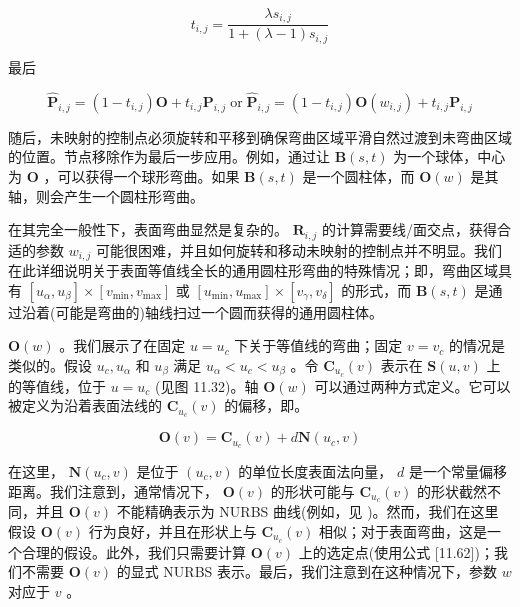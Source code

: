 \documentclass[../main.tex]{subfiles}
\begin{document}
\[
{t}_{i,j} = \frac{\lambda {s}_{i,j}}{1 + \left( {\lambda  - 1}\right) {s}_{i,j}} \tag{11.60}
\]





最后

\[
{\widehat{\mathbf{P}}}_{i,j} = \left( {1 - {t}_{i,j}}\right) \mathbf{O} + {t}_{i,j}{\mathbf{P}}_{i,j}\;\mathrm{{or}}\;{\widehat{\mathbf{P}}}_{i,j} = \left( {1 - {t}_{i,j}}\right) \mathbf{O}\left( {w}_{i,j}\right)  + {t}_{i,j}{\mathbf{P}}_{i,j} \tag{11.61}
\]

随后，未映射的控制点必须旋转和平移到确保弯曲区域平滑自然过渡到未弯曲区域的位置。节点移除作为最后一步应用。例如，通过让 \(\mathbf{B}\left( {s,t}\right)\) 为一个球体，中心为 \(\mathbf{O}\) ，可以获得一个球形弯曲。如果 \(\mathbf{B}\left( {s,t}\right)\) 是一个圆柱体，而 \(\mathbf{O}\left( w\right)\) 是其轴，则会产生一个圆柱形弯曲。

在其完全一般性下，表面弯曲显然是复杂的。 \({\mathbf{R}}_{i,j}\) 的计算需要线/面交点，获得合适的参数 \({w}_{i,j}\) 可能很困难，并且如何旋转和移动未映射的控制点并不明显。我们在此详细说明关于表面等值线全长的通用圆柱形弯曲的特殊情况；即，弯曲区域具有 \(\left\lbrack  {{u}_{\alpha },{u}_{\beta }}\right\rbrack   \times  \left\lbrack  {{v}_{\min },{v}_{\max }}\right\rbrack\) 或 \(\left\lbrack  {{u}_{\min },{u}_{\max }}\right\rbrack   \times  \left\lbrack  {{v}_{\gamma },{v}_{\delta }}\right\rbrack\) 的形式，而 \(\mathbf{B}\left( {s,t}\right)\) 是通过沿着(可能是弯曲的)轴线扫过一个圆而获得的通用圆柱体。



\(\mathbf{O}\left( w\right)\) 。我们展示了在固定 \(u = {u}_{c}\) 下关于等值线的弯曲；固定 \(v = {v}_{c}\) 的情况是类似的。假设 \({u}_{c},{u}_{\alpha }\) 和 \({u}_{\beta }\) 满足 \({u}_{\alpha } < {u}_{c} < {u}_{\beta }\) 。令 \({\mathbf{C}}_{{u}_{c}}\left( v\right)\) 表示在 \(\mathbf{S}\left( {u,v}\right)\) 上的等值线，位于 \(u = {u}_{c}\) (见图 11.32)。轴 \(\mathbf{O}\left( w\right)\) 可以通过两种方式定义。它可以被定义为沿着表面法线的 \({\mathbf{C}}_{{u}_{c}}\left( v\right)\) 的偏移，即。

\[
\mathbf{O}\left( v\right)  = {\mathbf{C}}_{{u}_{c}}\left( v\right)  + d\mathbf{N}\left( {{u}_{c},v}\right)  \tag{11.62}
\]



在这里， \(\mathbf{N}\left( {{u}_{c},v}\right)\) 是位于 \(\left( {{u}_{c},v}\right)\) 的单位长度表面法向量， \(d\) 是一个常量偏移距离。我们注意到，通常情况下， \(\mathbf{O}\left( v\right)\) 的形状可能与 \({\mathbf{C}}_{{u}_{c}}\left( v\right)\) 的形状截然不同，并且 \(\mathbf{O}\left( v\right)\) 不能精确表示为 NURBS 曲线(例如，见 \cite{Till84,Coqu87b,Hosc88})。然而，我们在这里假设 \(\mathbf{O}\left( v\right)\) 行为良好，并且在形状上与 \({\mathbf{C}}_{{u}_{c}}\left( v\right)\) 相似；对于表面弯曲，这是一个合理的假设。此外，我们只需要计算 \(\mathbf{O}\left( v\right)\) 上的选定点(使用公式 [11.62])；我们不需要 \(\mathbf{O}\left( v\right)\) 的显式 NURBS 表示。最后，我们注意到在这种情况下，参数 \(w\) 对应于 \(v\) 。
\end{document}
